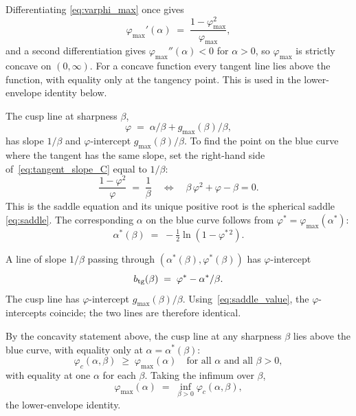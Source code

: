 \documentclass[letterpaper]{article} %
\newcommand{\Bnet}{\beta}
\begin{document}
Differentiating \eqref{eq:varphi_max} once gives
\begin{equation}
\varphi_{\max}'(\alpha) \;=\; \frac{1-\varphi_{\max}^2}{\varphi_{\max}},
\label{eq:tangent_slope_C}
\end{equation}
and a second differentiation gives $\varphi_{\max}''(\alpha) < 0$ for $\alpha > 0$,
so $\varphi_{\max}$ is strictly concave on $(0, \infty)$. For a concave function
every tangent line lies above the function, with equality only at the tangency
point. This is used in the lower-envelope identity below.

The cusp line at sharpness $\Bnet$,
\begin{equation}
\varphi \;=\; \alpha/\Bnet + g_{\max}(\Bnet)/\Bnet,
\end{equation}
has slope $1/\Bnet$ and $\varphi$-intercept $g_{\max}(\Bnet)/\Bnet$. To find the point on
the blue curve where the tangent has the same slope, set the right-hand side
of~\eqref{eq:tangent_slope_C} equal to $1/\Bnet$:
\begin{equation}
\frac{1-\varphi^2}{\varphi} \;=\; \frac{1}{\Bnet}
\quad\Longleftrightarrow\quad
\Bnet\,\varphi^2 + \varphi - \Bnet = 0.
\label{eq:saddle_eq_C}
\end{equation}
This is the saddle equation and its unique positive root is the spherical saddle \eqref{eq:saddle}.
The corresponding $\alpha$ on the blue curve follows from
$\varphi^* = \varphi_{\max}(\alpha^*)$:
\begin{equation}
\alpha^*(\Bnet) \;=\; -\tfrac12 \ln(1-\varphi^{*\,2}).
\label{eq:alpha_star_C}
\end{equation}

A line of slope $1/\Bnet$ passing through $(\alpha^*(\Bnet), \varphi^*(\Bnet))$ has
$\varphi$-intercept
\begin{equation}
b_{\rm tg}(\Bnet) \;=\; \varphi^* - \alpha^*/\Bnet.
\end{equation}
The cusp line has $\varphi$-intercept $g_{\max}(\Bnet)/\Bnet$.
Using~\eqref{eq:saddle_value}, the $\varphi$-intercepts coincide;
the two lines are therefore identical.

By the concavity statement above, the cusp line at any sharpness $\Bnet$ lies above the blue curve, with equality only at
$\alpha = \alpha^*(\Bnet)$:
\begin{equation}
\varphi_c(\alpha, \Bnet) \;\ge\; \varphi_{\max}(\alpha) \quad \text{for all $\alpha$ and all $\Bnet > 0$},
\end{equation}
with equality at one $\alpha$ for each $\Bnet$. Taking the infimum over $\Bnet$,
\begin{equation}
\varphi_{\max}(\alpha) \;=\; \inf_{\Bnet > 0} \varphi_c(\alpha, \Bnet),
\label{eq:lower_envelope_C}
\end{equation}
the lower-envelope identity.
\end{document}
